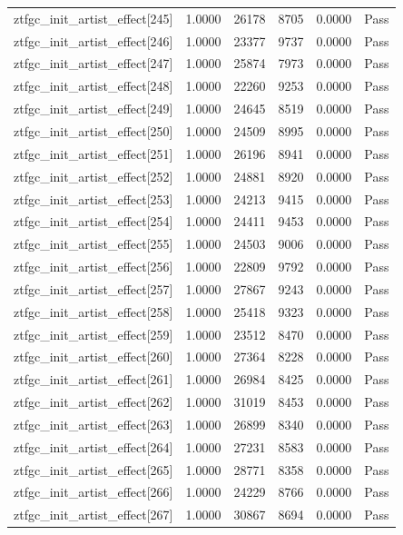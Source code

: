 \begin{table}[htbp]
\begin{tabular}{llrrll}
ztfgc\_init\_artist\_effect[245] & 1.0000 & 26178 & 8705 & 0.0000 & Pass \\
ztfgc\_init\_artist\_effect[246] & 1.0000 & 23377 & 9737 & 0.0000 & Pass \\
ztfgc\_init\_artist\_effect[247] & 1.0000 & 25874 & 7973 & 0.0000 & Pass \\
ztfgc\_init\_artist\_effect[248] & 1.0000 & 22260 & 9253 & 0.0000 & Pass \\
ztfgc\_init\_artist\_effect[249] & 1.0000 & 24645 & 8519 & 0.0000 & Pass \\
ztfgc\_init\_artist\_effect[250] & 1.0000 & 24509 & 8995 & 0.0000 & Pass \\
ztfgc\_init\_artist\_effect[251] & 1.0000 & 26196 & 8941 & 0.0000 & Pass \\
ztfgc\_init\_artist\_effect[252] & 1.0000 & 24881 & 8920 & 0.0000 & Pass \\
ztfgc\_init\_artist\_effect[253] & 1.0000 & 24213 & 9415 & 0.0000 & Pass \\
ztfgc\_init\_artist\_effect[254] & 1.0000 & 24411 & 9453 & 0.0000 & Pass \\
ztfgc\_init\_artist\_effect[255] & 1.0000 & 24503 & 9006 & 0.0000 & Pass \\
ztfgc\_init\_artist\_effect[256] & 1.0000 & 22809 & 9792 & 0.0000 & Pass \\
ztfgc\_init\_artist\_effect[257] & 1.0000 & 27867 & 9243 & 0.0000 & Pass \\
ztfgc\_init\_artist\_effect[258] & 1.0000 & 25418 & 9323 & 0.0000 & Pass \\
ztfgc\_init\_artist\_effect[259] & 1.0000 & 23512 & 8470 & 0.0000 & Pass \\
ztfgc\_init\_artist\_effect[260] & 1.0000 & 27364 & 8228 & 0.0000 & Pass \\
ztfgc\_init\_artist\_effect[261] & 1.0000 & 26984 & 8425 & 0.0000 & Pass \\
ztfgc\_init\_artist\_effect[262] & 1.0000 & 31019 & 8453 & 0.0000 & Pass \\
ztfgc\_init\_artist\_effect[263] & 1.0000 & 26899 & 8340 & 0.0000 & Pass \\
ztfgc\_init\_artist\_effect[264] & 1.0000 & 27231 & 8583 & 0.0000 & Pass \\
ztfgc\_init\_artist\_effect[265] & 1.0000 & 28771 & 8358 & 0.0000 & Pass \\
ztfgc\_init\_artist\_effect[266] & 1.0000 & 24229 & 8766 & 0.0000 & Pass \\
ztfgc\_init\_artist\_effect[267] & 1.0000 & 30867 & 8694 & 0.0000 & Pass \\

\end{tabular}
\end{table}
